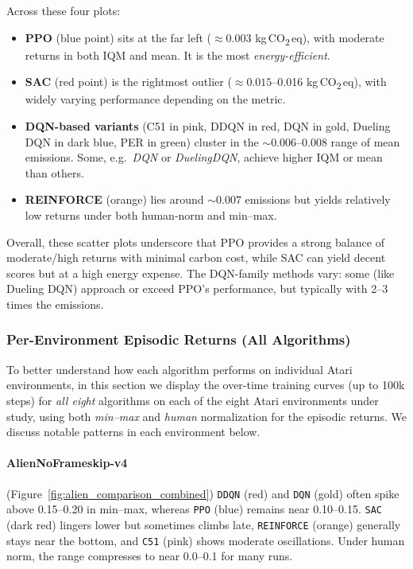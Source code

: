 Across these four plots:
\begin{itemize}
	\item \textbf{PPO} (blue point) sits at the far left (\(\approx 0.003\) kg\,CO\textsubscript{2}\,eq), 
	with moderate returns in both IQM and mean. It is the most \emph{energy-efficient}.
	\item \textbf{SAC} (red point) is the rightmost outlier (\(\approx 0.015\)–0.016 kg\,CO\textsubscript{2}\,eq), 
	with widely varying performance depending on the metric. 
	\item \textbf{DQN-based variants} (C51 in pink, DDQN in red, DQN in gold,
	Dueling DQN in dark blue, PER in green) cluster in the \(\sim0.006\)--0.008 range
	of mean emissions. Some, e.g.\ \emph{DQN} or \emph{DuelingDQN}, achieve higher 
	IQM or mean than others.
	\item \textbf{REINFORCE} (orange) lies around \(\sim0.007\) emissions but yields 
	relatively low returns under both human‐norm and min–max.
\end{itemize}
Overall, these scatter plots underscore that PPO provides a strong balance of 
moderate/high returns with minimal carbon cost, while SAC can yield decent 
scores but at a high energy expense. The DQN-family methods vary: some (like 
Dueling DQN) approach or exceed PPO's performance, but typically with 2--3 times the emissions.

\subsubsection{Per-Environment Episodic Returns (All Algorithms)}
\label{sssec:per_env_all}

To better understand how each algorithm performs on individual Atari environments,
in this section we display the over-time training curves (up to 100k steps) for 
\emph{all eight} algorithms on each of the eight Atari environments under study, 
using both \textit{min--max} and \textit{human} normalization for the episodic returns. 
We discuss notable patterns in each environment below.

\paragraph{AlienNoFrameskip-v4}
(Figure~\ref{fig:alien_comparison_combined})
\texttt{DDQN} (red) and \texttt{DQN} (gold) often spike above 0.15--0.20 in min--max, 
whereas \texttt{PPO} (blue) remains near 0.10--0.15. 
\texttt{SAC} (dark red) lingers lower but sometimes climbs late, 
\texttt{REINFORCE} (orange) generally stays near the bottom, and \texttt{C51} (pink) 
shows moderate oscillations. 
Under human norm, the range compresses to near 0.0--0.1 for many runs.

